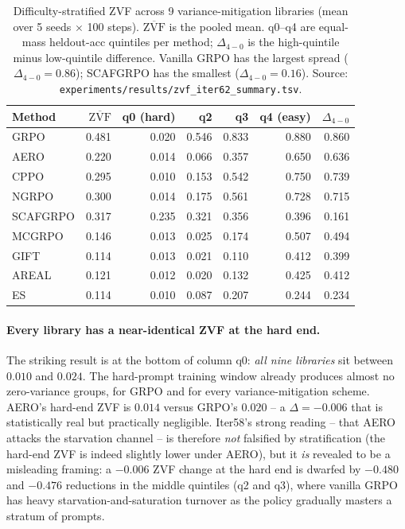 \begin{table}[htbp]
\centering
\small
\setlength{\tabcolsep}{3pt}
\begin{tabular}{lrrrrrr}
\hline
Method & $\overline{\mathrm{ZVF}}$ & q0 (hard) & q2 & q3 & q4 (easy) & $\Delta_{4-0}$ \\
\hline
GRPO     & 0.481 & 0.020 & 0.546 & 0.833 & 0.880 & 0.860 \\
AERO     & 0.220 & 0.014 & 0.066 & 0.357 & 0.650 & 0.636 \\
CPPO     & 0.295 & 0.010 & 0.153 & 0.542 & 0.750 & 0.739 \\
NGRPO    & 0.300 & 0.014 & 0.175 & 0.561 & 0.728 & 0.715 \\
SCAFGRPO & 0.317 & 0.235 & 0.321 & 0.356 & 0.396 & 0.161 \\
MCGRPO   & 0.146 & 0.013 & 0.025 & 0.174 & 0.507 & 0.494 \\
GIFT     & 0.114 & 0.013 & 0.021 & 0.110 & 0.412 & 0.399 \\
AREAL    & 0.121 & 0.012 & 0.020 & 0.132 & 0.425 & 0.412 \\
ES       & 0.114 & 0.010 & 0.087 & 0.207 & 0.244 & 0.234 \\
\hline
\end{tabular}
\caption{Difficulty-stratified ZVF across 9 variance-mitigation
libraries (mean over 5 seeds $\times$ 100 steps). $\overline{\mathrm{ZVF}}$
is the pooled mean. q0--q4 are equal-mass heldout-acc quintiles per
method; $\Delta_{4-0}$ is the high-quintile minus low-quintile
difference. Vanilla GRPO has the largest spread ($\Delta_{4-0}{=}0.86$);
SCAFGRPO has the smallest ($\Delta_{4-0}{=}0.16$). Source:
\texttt{experiments/results/zvf\_iter62\_summary.tsv}.}
\label{tab:zvf-strat}
\end{table}

\paragraph{Every library has a near-identical ZVF at the hard end.}
The striking result is at the bottom of column q0: \emph{all nine
libraries} sit between $0.010$ and $0.024$. The hard-prompt
training window already produces almost no zero-variance groups, for
GRPO and for every variance-mitigation scheme. AERO's hard-end ZVF
is $0.014$ versus GRPO's $0.020$ -- a $\Delta = -0.006$ that is
statistically real but practically negligible. Iter58's strong
reading -- that AERO attacks the starvation channel -- is therefore
\emph{not} falsified by stratification (the hard-end ZVF is indeed
slightly lower under AERO), but it \emph{is} revealed to be a
misleading framing: a $-0.006$ ZVF change at the hard end is dwarfed
by $-0.480$ and $-0.476$ reductions in the middle quintiles (q2 and
q3), where vanilla GRPO has heavy starvation-and-saturation turnover
as the policy gradually masters a stratum of prompts.

